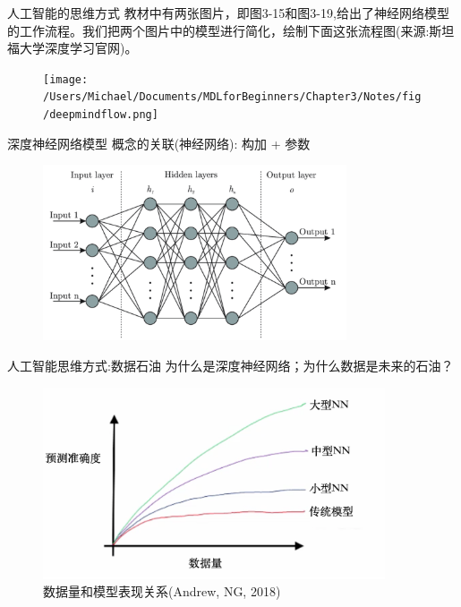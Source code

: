 \documentclass[handout]{beamer}
\begin{document}
\begin{frame}{人工智能的思维方式}
教材中有两张图片，即图3-15和图3-19,给出了神经网络模型的工作流程。我们把两个图片中的模型进行简化，绘制下面这张流程图(来源:斯坦福大学深度学习官网)。
\begin{figure}[H]
	\centering
	\texttt{[image: /Users/Michael/Documents/MDLforBeginners/Chapter3/Notes/fig/deepmindflow.png]}
\end{figure}
\end{frame}

\begin{frame}{深度神经网络模型}
	概念的关联(神经网络): 构加 + 参数
	\begin{figure}[H]
		\centering
		\includegraphics[width=0.8\textwidth]{fig/StdNN}
	\end{figure}
\end{frame}

\begin{frame}{人工智能思维方式:数据石油}
	为什么是深度神经网络；为什么数据是未来的石油？
	\begin{figure}[H]
		\centering
		\includegraphics[width=0.9\textwidth]{fig/dataoil}
		\caption{数据量和模型表现关系(Andrew, NG, 2018)}
	\end{figure}
\end{frame}
\end{document}
